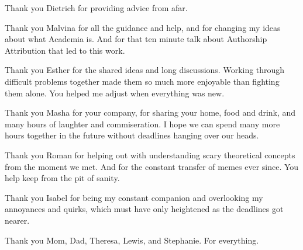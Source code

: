 \documentclass[12pt] {newrucsthesis}    %
\begin{document}
Thank you Dietrich for providing advice from afar.

Thank you Malvina for all the guidance and help, and for changing my ideas about what Academia is. And for that ten minute talk about Authorship Attribution that led to this work.

Thank you Esther for the shared ideas and long discussions. Working through difficult problems together made them so much more enjoyable than fighting them alone. You helped me adjust when everything was new.

Thank you Masha for your company, for sharing your home, food and drink, and many hours of laughter and commiseration. I hope we can spend many more hours together in the future without deadlines hanging over our heads.

Thank you Roman for helping out with understanding scary theoretical concepts from the moment we met. And for the constant transfer of memes ever since. You help keep from the pit of sanity.

Thank you Isabel for being my constant companion and overlooking my annoyances and quirks, which must have only heightened as the deadlines got nearer.

Thank you Mom, Dad, Theresa, Lewis, and Stephanie. For everything.
\newpage

\tableofcontents
\newpage

\listoffigures
\newpage

\listoftables
\newpage









% 
%

 
\end{document}
